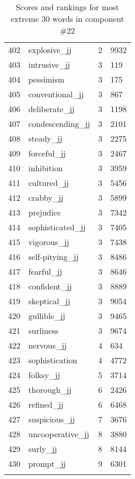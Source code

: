 \begin{longtable}[!htbp]{| rlr@{.}l |}
    402 & explosive\_jj & 2 & 9932 \\
    403 & intrusive\_jj & 3 & 119 \\
    404 & pessimism & 3 & 175 \\
    405 & conventional\_jj & 3 & 867 \\
    406 & deliberate\_jj & 3 & 1198 \\
    407 & condescending\_jj & 3 & 2101 \\
    408 & steady\_jj & 3 & 2275 \\
    409 & forceful\_jj & 3 & 2467 \\
    410 & inhibition & 3 & 3959 \\
    411 & cultured\_jj & 3 & 5456 \\
    412 & crabby\_jj & 3 & 5899 \\
    413 & prejudice & 3 & 7342 \\
    414 & sophisticated\_jj & 3 & 7405 \\
    415 & vigorous\_jj & 3 & 7438 \\
    416 & self-pitying\_jj & 3 & 8486 \\
    417 & fearful\_jj & 3 & 8646 \\
    418 & confident\_jj & 3 & 8889 \\
    419 & skeptical\_jj & 3 & 9054 \\
    420 & gullible\_jj & 3 & 9465 \\
    421 & surliness & 3 & 9674 \\
    422 & nervous\_jj & 4 & 634 \\
    423 & sophistication & 4 & 4772 \\
    424 & folksy\_jj & 5 & 3714 \\
    425 & thorough\_jj & 6 & 2426 \\
    426 & refined\_jj & 6 & 6468 \\
    427 & suspicious\_jj & 7 & 3676 \\
    428 & uncooperative\_jj & 8 & 3880 \\
    429 & surly\_jj & 8 & 8144 \\
    430 & prompt\_jj & 9 & 6301 \\
    \hline
    \caption{Scores and rankings for most extreme 30 words in component \#22} \\
\end{longtable}
